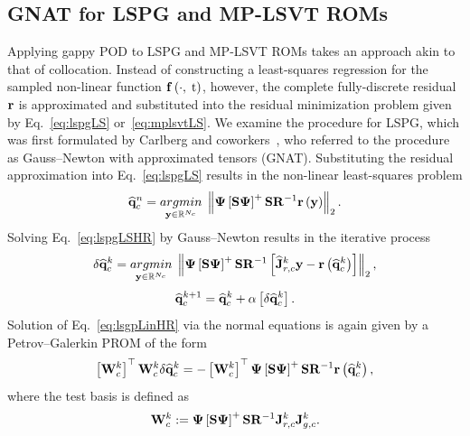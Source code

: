 \subsection{GNAT for LSPG and MP-LSVT ROMs}
%
Applying gappy POD to LSPG and MP-LSVT ROMs takes an approach akin to that of collocation. Instead of constructing a least-squares regression for the sampled non-linear function $\mathbf{f} \left(\cdot, \; \text{t}\right)$, however, the complete fully-discrete residual $\mathbf{r}$ is approximated and substituted into the residual minimization problem given by Eq.~\ref{eq:lspgLS} or~\ref{eq:mplsvtLS}. We examine the procedure for LSPG, which was first formulated by Carlberg and coworkers~\cite{Carlberg2010,Carlberg2013}, who referred to the procedure as Gauss--Newton with approximated tensors (GNAT). Substituting the residual approximation into Eq.~\ref{eq:lspgLS} results in the non-linear least-squares problem
%
\begin{equation}\label{eq:lspgLSHR}
    \consVecCoef^{\timeIdx} = \argmin{\dummyVec \inROne{\numConsModes}} \left\Vert \deimBasis \left[ \sampMat \deimBasis \right]^{+} \sampMat \resScaleInv \resFunc{\dummyVec} \right\Vert_2.
\end{equation}
%
Solving Eq.~\ref{eq:lspgLSHR} by Gauss--Newton results in the iterative process
%
\begin{equation}\label{eq:lsgpLinHR}
    \delta \consVecCoef^{\newtonIdx} = \argmin{\dummyVec \inROne{\numConsModes}} \left\Vert \deimBasis \left[ \sampMat \deimBasis \right]^{+} \sampMat \resScaleInv \left[ \jacobResCoefCons^{\newtonIdx} \dummyVec - \resFunc{\consVecCoef^{\newtonIdx}}\right] \right\Vert_2,
\end{equation}
\begin{equation}
    \mathbf{\widehat{q}}_{c}^{k + 1} = \mathbf{\widehat{q}}_{c}^{k} + \alpha \left[ \delta \mathbf{\widehat{q}}_{c}^{k} \right].
\end{equation}
%
Solution of Eq.~\ref{eq:lsgpLinHR} via the normal equations is again given by a Petrov--Galerkin PROM of the form
%
\begin{equation}\label{eq:lspgHRSolve}
    \left[ \testBasisCons^\newtonIdx \right]^\top \testBasisCons^\newtonIdx \delta \consVecCoef^{\newtonIdx} = -\left[\testBasisCons^\newtonIdx \right]^\top \deimBasis \left[ \sampMat \deimBasis \right]^{+} \sampMat \resScaleInv \resFunc{\consVecCoef^{\newtonIdx}},
\end{equation}
%
where the test basis is defined as
%
\begin{equation}\label{eq:lspgHRTest}
    \testBasisCons^\newtonIdx \defEq \deimBasis \left[ \sampMat \deimBasis \right]^{+} \sampMat \resScaleInv \jacobResCons^{\newtonIdx} \jacobDecodeCons^{\newtonIdx}.
\end{equation}
